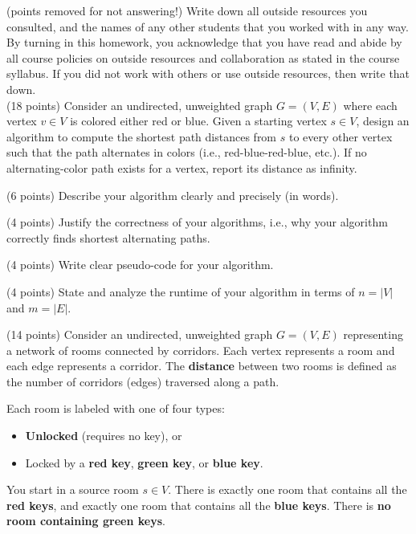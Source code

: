 \documentclass[11  pt]{article}
\begin{document}
	
		
\problem (points removed for not answering!) Write down all outside resources you consulted, and the names of any other students that you worked with in any way. By turning in this homework, you acknowledge that you have read and abide by all course policies on outside resources and collaboration as stated in the course syllabus. If you did not work with others or use outside resources, then write that down.\\
	
\vspace{0.5in}
\problem (18 points)
Consider an undirected, unweighted graph $G = (V, E)$ where each vertex $v \in V$ is colored either red or blue. 
Given a starting vertex $s \in V$, design an algorithm to compute the shortest path distances from $s$ to every other vertex such that the path alternates in colors (i.e., red-blue-red-blue, etc.). 
If no alternating-color path exists for a vertex, report its distance as infinity.

\babc
\item (6 points) 
Describe your algorithm clearly and precisely (in words).  
\vfill

\item (4 points) 
Justify the correctness of your algorithms, i.e., why your algorithm correctly finds shortest alternating paths.
\vfill

\item (4 points) 
Write clear pseudo-code for your algorithm.
\vfill

\item (4 points) 
State and analyze the runtime of your algorithm in terms of $n=|V|$ and $m=|E|$.
\vfill
\eabc

\newpage
\problem (14 points)
Consider an undirected, unweighted graph $G = (V, E)$ representing a network of rooms connected by corridors. 
Each vertex represents a room and each edge represents a corridor.  
The \textbf{distance} between two rooms is defined as the number of corridors (edges) traversed along a path.

Each room is labeled with one of four types:
\begin{itemize}
\item 
\textbf{Unlocked} (requires no key), or
\item 
Locked by a \textbf{red key}, \textbf{green key}, or \textbf{blue key}.
\end{itemize}
You start in a source room $s \in V$. 
There is exactly one room that contains all the \textbf{red keys}, and exactly one room that contains all the \textbf{blue keys}.  
There is \textbf{no room containing green keys}.  
\end{document}
